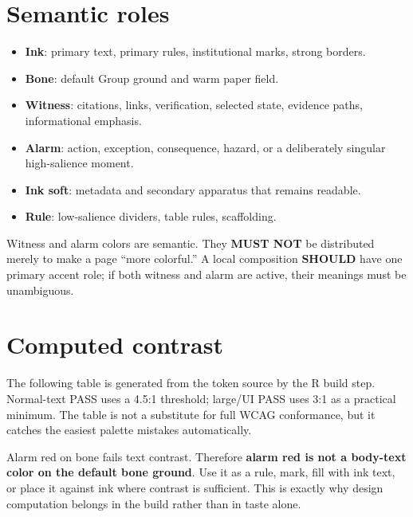 \documentclass[11pt,twoside,openany]{report}
\newcommand{\MUSTNOT}{\textbf{MUST NOT}\xspace}
\newcommand{\SHOULD}{\textbf{SHOULD}\xspace}
\begin{document}
\section{Semantic roles}
\begin{itemize}
  \item \textbf{Ink}: primary text, primary rules, institutional marks, strong borders.
  \item \textbf{Bone}: default Group ground and warm paper field.
  \item \textbf{Witness}: citations, links, verification, selected state, evidence paths, informational emphasis.
  \item \textbf{Alarm}: action, exception, consequence, hazard, or a deliberately singular high-salience moment.
  \item \textbf{Ink soft}: metadata and secondary apparatus that remains readable.
  \item \textbf{Rule}: low-salience dividers, table rules, scaffolding.
\end{itemize}

\begin{specbox}
Witness and alarm colors are semantic. They \MUSTNOT be distributed merely to make a page ``more colorful.'' A local composition \SHOULD have one primary accent role; if both witness and alarm are active, their meanings must be unambiguous.
\end{specbox}

\section{Computed contrast}
The following table is generated from the token source by the R build step. Normal-text PASS uses a 4.5:1 threshold; large/UI PASS uses 3:1 as a practical minimum. The table is not a substitute for full WCAG conformance, but it catches the easiest palette mistakes automatically.


\begin{alarmbox}
Alarm red on bone fails text contrast. Therefore \textbf{alarm red is not a body-text color on the default bone ground}. Use it as a rule, mark, fill with ink text, or place it against ink where contrast is sufficient. This is exactly why design computation belongs in the build rather than in taste alone.
\end{alarmbox}
\end{document}
